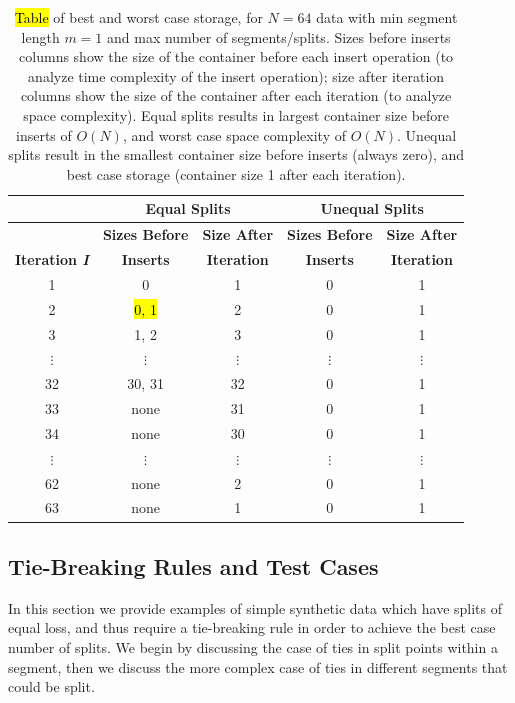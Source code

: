 \documentclass[algorithms,article,accept,oneauthor]{Definitions/mdpi}
\begin{document}
\begin{table}[H]
    \caption{\hl{Table} %
 of best and worst case storage, for $N=64$ data with min segment length $m=1$ and max number of segments/splits.
    Sizes before inserts columns show the size of the container before each insert operation (to analyze time complexity of the insert operation); size after iteration columns show the size of the container after each iteration (to analyze space complexity).
    Equal splits results in largest container size before inserts of $O(N)$, and worst case space complexity of $O(N)$. 
    Unequal splits result in the smallest container size before inserts (always zero), and best case storage (container size 1 after each iteration).}
    \label{tab:best-worst-storage}\setlength{\tabcolsep}{5mm} 
\begin{tabular}{ccccc}\toprule
     & \multicolumn{2}{c}{\textbf{Equal Splits}}    & \multicolumn{2}{c}{\textbf{Unequal Splits}}  \\
     \midrule
     &  \textbf{Sizes Before}  &   \textbf{Size After}   & \textbf{Sizes Before} & \textbf{Size After} \\
 \textbf{Iteration \textit{I}} &  \textbf{Inserts} &  \textbf{Iteration} &  \textbf{Inserts} &  \textbf{Iteration} \\
\midrule
 1 & 0   & 1 & 0 & 1 \\
 2 & \hl{0, 1} %
 & 2 & 0 & 1 \\ 
 3 & {1, 2} & 3 & 0 & 1 \\
$\vdots$ &     $\vdots$ &     $\vdots$  & $\vdots$ & $\vdots$ \\
32 & 30, 31 & 32 & 0 & 1 \\
33 &  none     & 31 & 0 & 1 \\
34 &  none     & 30 & 0 & 1 \\
$\vdots$ &     $\vdots$ &     $\vdots$  & $\vdots$ & $\vdots$ \\
62 &  none     & 2 & 0 & 1 \\
63 &  none     & 1 & 0 & 1\\\bottomrule
\end{tabular}
\end{table}


\subsection{Tie-Breaking Rules and Test Cases}
\label{ties-in-different-segments}
In this section we provide examples of simple synthetic data which have splits of equal loss, and thus require a tie-breaking rule in order to achieve the best case number of splits.
We begin by discussing the case of ties in split points within a segment, then we discuss the more complex case of ties in different segments that could be split.
\end{document}
